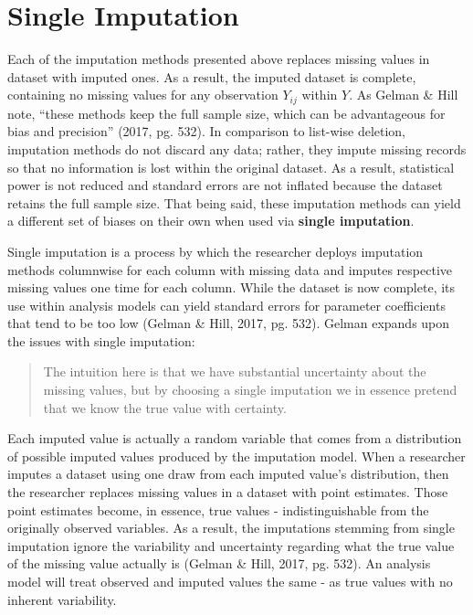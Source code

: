 \documentclass[12pt,oneside]{chicagocapstone}
\begin{document}
\hypertarget{background-single-imputation}{\section*{Single
Imputation}\label{background-single-imputation}}

Each of the imputation methods presented above replaces missing values
in dataset with imputed ones. As a result, the imputed dataset is
complete, containing no missing values for any observation \(Y_{ij}\)
within \(Y\). As Gelman \& Hill note, ``these methods keep the full
sample size, which can be advantageous for bias and precision'' (2017,
pg. 532). In comparison to list-wise deletion, imputation methods do not
discard any data; rather, they impute missing records so that no
information is lost within the original dataset. As a result,
statistical power is not reduced and standard errors are not inflated
because the dataset retains the full sample size. That being said, these
imputation methods can yield a different set of biases on their own when
used via \textbf{single imputation}.

Single imputation is a process by which the researcher deploys
imputation methods columnwise for each column with missing data and
imputes respective missing values one time for each column. While the
dataset is now complete, its use within analysis models can yield
standard errors for parameter coefficients that tend to be too low
(Gelman \& Hill, 2017, pg. 532). Gelman expands upon the issues with
single imputation:
\begin{quote}
The intuition here is that we have substantial uncertainty about the
missing values, but by choosing a single imputation we in essence
pretend that we know the true value with certainty.
\end{quote}
Each imputed value is actually a random variable that comes from a
distribution of possible imputed values produced by the imputation
model. When a researcher imputes a dataset using one draw from each
imputed value's distribution, then the researcher replaces missing
values in a dataset with point estimates. Those point estimates become,
in essence, true values - indistinguishable from the originally observed
variables. As a result, the imputations stemming from single imputation
ignore the variability and uncertainty regarding what the true value of
the missing value actually is (Gelman \& Hill, 2017, pg. 532). An
analysis model will treat observed and imputed values the same - as true
values with no inherent variability.
\end{document}
